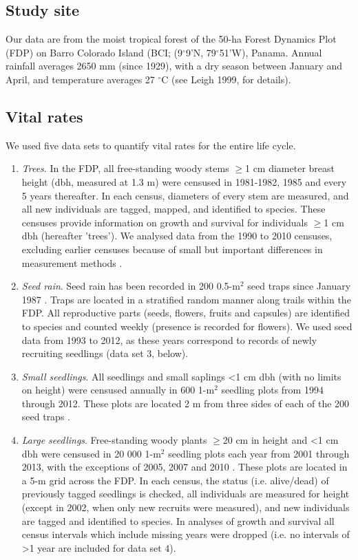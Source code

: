 \documentclass[b5paper,justified]{tufte-book} %
\begin{document}
\begin{fullwidth}
\subsection{Study site}
Our data are from the moist tropical forest of the 50-ha Forest Dynamics Plot (FDP) on Barro Colorado Island (BCI; (9$^{\circ}$9'N, 79$^{\circ}$51'W), Panama. Annual rainfall averages 2650 mm (since 1929), with a dry season between January and April, and temperature averages 27 $^{\circ}$C (see Leigh 1999, for details). 

\subsection{Vital rates}
We used five data sets to quantify vital rates for the entire life
cycle.

\begin{enumerate}
\item \textit{Trees}. In the FDP, all free-standing woody stems $\geq$1 cm diameter breast height (dbh, measured at 1.3 m) were censused in 1981-1982, 1985 and every 5 years thereafter. In each census, diameters of every stem are measured, and all new individuals are tagged, mapped, and identified to species. These censuses provide information on growth and survival for individuals $\geq$1 cm dbh (hereafter 'trees'). We analysed data from the 1990 to 2010 censuses, excluding earlier censuses because of small but important differences in measurement methods \citep{Condit1999, Rueger2009}.
\item \textit{Seed rain}. Seed rain has been recorded in 200 0.5-m$^2$ seed traps since January 1987 \citep{Wright2005a}. Traps are located in a stratified random manner along trails within the FDP. All reproductive parts (seeds, flowers, fruits and capsules) are identified to species and counted weekly (presence is recorded for flowers). We used seed data from 1993 to 2012, as these years correspond to records of newly recruiting seedlings (data set 3, below).

\item \textit{Small seedlings}. All seedlings and small saplings <1 cm dbh (with no limits on height) were censused annually in 600 1-m$^2$ seedling plots from 1994 through 2012. These plots are located 2 m from three sides of each of the 200 seed traps \citep{Wright2005a}.

\item \textit{Large seedlings}. Free-standing woody plants $\geq$20 cm in height and <1 cm dbh were censused in 20 000 1-m$^2$ seedling plots each year from 2001 through 2013, with the exceptions of 2005, 2007 and 2010 \citep{Comita2007, Comita2009}. These plots are located in a 5-m grid across the FDP. In each census,
the status (i.e. alive/dead) of previously tagged seedlings is checked, all individuals are measured for height (except in 2002, when only new recruits were measured), and new individuals are tagged and identified to species. In analyses of growth and survival all census intervals which include missing years were dropped (i.e. no intervals of >1 year are included for data set 4).


\end{enumerate}
\end{fullwidth}
\end{document}
